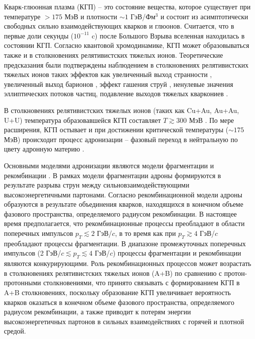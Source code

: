 {\actuality} Кварк-глюонная плазма (КГП) -- это состояние вещества, которое существует при температуре $>175$ МэВ и плотности $\sim1$ ГэВ/Фм$^3$ \autocite{firstQGP, firstQGPcern, QGP} и состоит из асимптотически свободных сильно взаимодействующих кварков и глюонов. Считается, что в первые доли секунды ($10^{-11}$ c) после Большого Взрыва вселенная находилась в состоянии КГП. Согласно квантовой хромодинамике, КГП может образовываться также и в столкновениях релятивистских тяжелых ионов. Теоретические предсказания \autocite{firstQGP} были подтверждены наблюдением в столкновениях релятивистских тяжелых ионов таких эффектов как увеличенный выход странности \autocite{StrangEnh, Strangeness_QGP}, увеличенный выход барионов \autocite{BaryonPuzzleHeavy,p2piRatio_2003,p2piRatio_130GeV}, эффект гашения струй \autocite{JetQuenching1, JetQuenching2, JetQuenching3}, ненулевые значения эллиптических потоков частиц, подавление выходов тяжелых кваркониев \cite{quarkonia_melting, quarkonium_suppression}. 


В столкновениях релятивистских тяжелых ионов (таких как Cu+Au, Au+Au, U+U) температура образовавшейся КГП составляет $T\gtrsim300$ МэВ \autocite{Coalescence_models}. По мере расширения, КГП остывает и при достижении критической температуры ($\sim175$ МэВ) происходит процесс адронизации \cite{QGP, QGP, Coalescence_models} -- фазовый переход в нейтральную по цвету адронную материю \autocite{nucleus2020}. 

Основными моделями адронизации являются модели фрагментации \cite{FragmentationLund} и рекомбинации \autocite{Coalescence_models, Recombination1, Recombination2}. В рамках модели фрагментации адроны формируются в результате разрыва струн между сильновзаимодействующими высокоэнергетичными партонами.
Согласно рекомбинационной модели адроны образуются в результате объединения кварков, находящихся в конечном объеме фазового пространства, определяемого радиусом рекомбинации. 
В настоящее время предполагается, что рекомбинационные процессы преобладают в области поперечных импульсов $p_T \lesssim 2$ ГэВ/$c$, в то время как при $p_T \gtrsim 4$ ГэВ/$c$ преобладают
процессы фрагментации. В диапазоне промежуточных поперечных импульсов (2 ГэВ/$c \lesssim p_T \lesssim 4$ ГэВ/$c$) процессы фрагментации и рекомбинации являются конкурирующими.
Роль рекомбинационных процессов может возрастать в столкновениях релятивистских тяжелых ионов (A+B) по сравнению с протон-протонными столкновениями, что принято связывать \cite{Recombination1, Recombination2, BaryonPuzzleHeavy} с формированием КГП в A+B столкновениях, поскольку
образование КГП увеличивает вероятность кварков оказаться в конечном объеме фазового пространства, определяемого радиусом рекомбинации, а также приводит к потерям энергии высокоэнергетичных партонов в сильных взаимодействиях с горячей и плотной средой.

